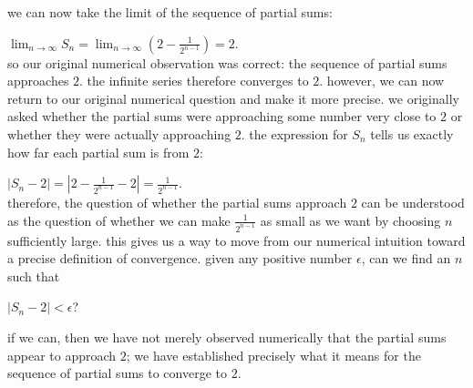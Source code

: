 \documentclass{article}
\begin{document}
we can now take the limit of the sequence of partial sums:

$\lim_{n\to\infty}S_n=\lim_{n\to\infty}\left(2-\frac{1}{2^{n-1}}\right)=2$.\\

so our original numerical observation was correct: the sequence of partial sums approaches $2$. the infinite series therefore converges to $2$. however, we can now return to our original numerical question and make it more precise. we originally asked whether the partial sums were approaching some number very close to $2$ or whether they were actually approaching $2$. the expression for $S_n$ tells us exactly how far each partial sum is from $2$:

$|S_n-2|=\left|2-\frac{1}{2^{n-1}}-2\right|=\frac{1}{2^{n-1}}$.\\

therefore, the question of whether the partial sums approach $2$ can be understood as the question of whether we can make $\frac{1}{2^{n-1}}$ as small as we want by choosing $n$ sufficiently large. this gives us a way to move from our numerical intuition toward a precise definition of convergence. given any positive number $\epsilon$, can we find an $n$ such that

$|S_n-2|<\epsilon$?

if we can, then we have not merely observed numerically that the partial sums appear to approach $2$; we have established precisely what it means for the sequence of partial sums to converge to $2$.
\end{document}
